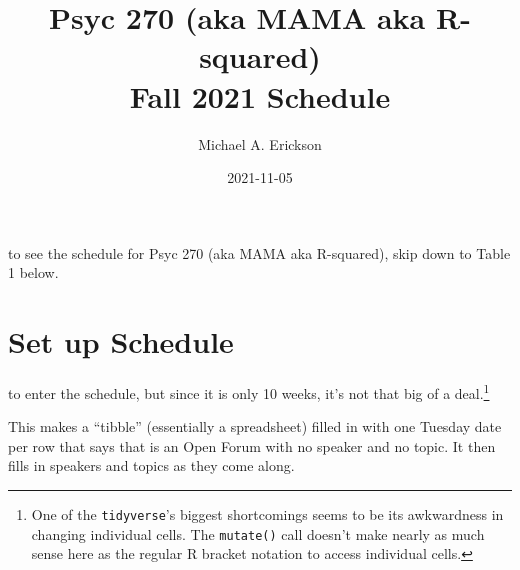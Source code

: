 \documentclass[]{tufte-handout}
\title{Psyc 270 (aka MAMA aka R-squared)\\
Fall 2021 Schedule}
\author{Michael A. Erickson}
\date{2021-11-05}
\begin{document}
\maketitle




 to see the schedule for Psyc 270 (aka MAMA
aka R-squared), skip down to Table 1 below.

\hypertarget{set-up-schedule}{%
\section{Set up Schedule}\label{set-up-schedule}}

 to enter the schedule, but since it
is only 10 weeks, it's not that big of a deal.\footnote{One of the
  \texttt{tidyverse}'s biggest shortcomings seems to be its awkwardness
  in changing individual cells. The \texttt{mutate()} call doesn't make
  nearly as much sense here as the regular R bracket notation to access
  individual cells.}

This makes a ``tibble'' (essentially a spreadsheet) filled in with one
Tuesday date per row that says that is an Open Forum with no speaker and
no topic. It then fills in speakers and topics as they come along.
\end{document}
